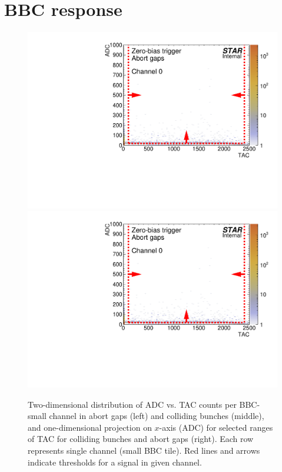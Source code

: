 
\chapter{BBC response}\label{appendix:bbc}

\begin{figure}[hb]
\caption[Distribution of ADC vs. TAC counts (2D) and ADC conunts (1D) per BBC-small channel in abort gaps and colliding bunches.]{Two-dimensional distribution of ADC vs. TAC counts per BBC-small channel in abort gaps (left) and colliding bunches (middle), and one-dimensional projection on $x$-axis (ADC) for selected ranges of TAC for colliding bunches and abort gaps (right). Each row represents single channel (small BBC tile). Red lines and arrows indicate thresholds for a signal in given channel.}\label{fig:bbcSmallAdcVsTac}
\centering
\parbox{0.327\textwidth}{
  \centering
  \includegraphics[width=\linewidth,page=1]{graphics/eventSelection/bbc/Bbc_ADCvsTAC_abortGaps.pdf}\\
  \includegraphics[width=\linewidth,page=2]{graphics/eventSelection/bbc/Bbc_ADCvsTAC_abortGaps.pdf}\\
}
\end{figure}
